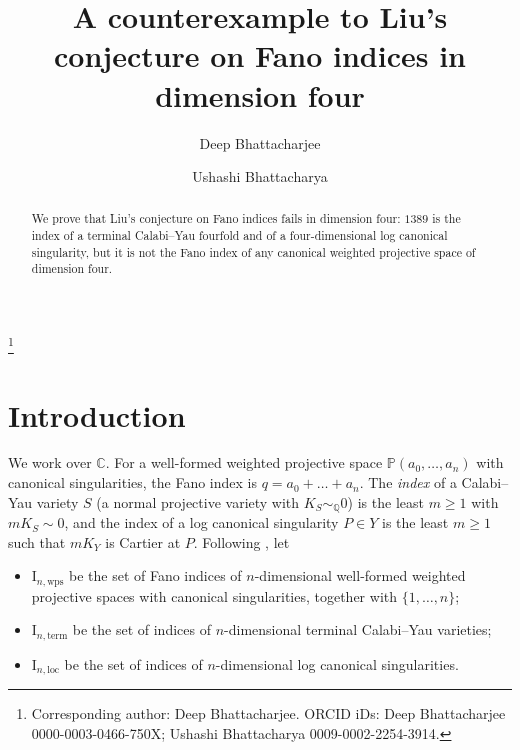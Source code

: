 \documentclass{amsart}
\newif\ifanon
\theoremstyle{remark}
\newcommand{\C}{\mathbb{C}}
\newcommand{\PP}{\mathbb{P}}
\begin{document}
\title[Liu's conjecture on Fano indices]{A counterexample to Liu's conjecture on Fano indices in dimension four}

\ifanon\else
\author{Deep Bhattacharjee}
\address{Formerly, Electro-Gravitational Space Propulsion Laboratory (EGSPL),\newline Bhubaneswar, Odisha 751030, India}
\author{Ushashi Bhattacharya}
\address{Formerly, National Taiwan University, Taipei 106319, Taiwan}
\thanks{Corresponding author: Deep Bhattacharjee. ORCID iDs: Deep Bhattacharjee 0000-0003-0466-750X; Ushashi Bhattacharya 0009-0002-2254-3914.}
\fi


\begin{abstract}
We prove that Liu's conjecture on Fano indices fails in dimension four: $1389$ is the index of a terminal Calabi--Yau fourfold and of a four-dimensional log canonical singularity, but it is not the Fano index of any canonical weighted projective space of dimension four.
\end{abstract}

\maketitle

\section{Introduction}

We work over $\C$. For a well-formed weighted projective space $\PP(a_0,\dots,a_n)$ with canonical singularities, the Fano index is $q=a_0+\dots+a_n$. The \emph{index} of a Calabi--Yau variety $S$ (a normal projective variety with $K_S\sim_{\mathbb Q}0$) is the least $m\geq1$ with $mK_S\sim0$, and the index of a log canonical singularity $P\in Y$ is the least $m\geq1$ such that $mK_Y$ is Cartier at $P$. Following \cite[Definition~4.1]{Liu}, let
\begin{itemize}
\item $\mathrm{I}_{n,\mathrm{wps}}$ be the set of Fano indices of $n$-dimensional well-formed weighted projective spaces with canonical singularities, together with $\{1,\dots,n\}$;
\item $\mathrm{I}_{n,\mathrm{term}}$ be the set of indices of $n$-dimensional terminal Calabi--Yau varieties;
\item $\mathrm{I}_{n,\mathrm{loc}}$ be the set of indices of $n$-dimensional log canonical singularities.
\end{itemize}
\end{document}
